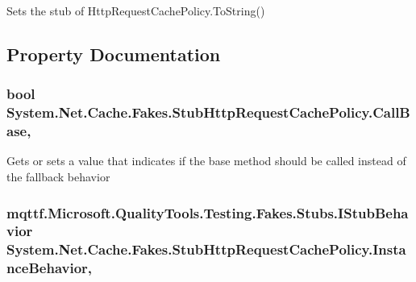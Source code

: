 Sets the stub of Http\-Request\-Cache\-Policy.\-To\-String()



\subsection{Property Documentation}
\hypertarget{class_system_1_1_net_1_1_cache_1_1_fakes_1_1_stub_http_request_cache_policy_aa3db4a29b2626996ae91bdab91d55253}{
\subsubsection[{Call\-Base}]{\setlength{\rightskip}{0pt plus 5cm}bool System.\-Net.\-Cache.\-Fakes.\-Stub\-Http\-Request\-Cache\-Policy.\-Call\-Base\hspace{0.3cm}{\ttfamily [get]}, {\ttfamily [set]}}}\label{class_system_1_1_net_1_1_cache_1_1_fakes_1_1_stub_http_request_cache_policy_aa3db4a29b2626996ae91bdab91d55253}


Gets or sets a value that indicates if the base method should be called instead of the fallback behavior

\hypertarget{class_system_1_1_net_1_1_cache_1_1_fakes_1_1_stub_http_request_cache_policy_aec680d2542fdfec1604d9ff9dc51595a}{
\subsubsection[{Instance\-Behavior}]{\setlength{\rightskip}{0pt plus 5cm}mqttf.\-Microsoft.\-Quality\-Tools.\-Testing.\-Fakes.\-Stubs.\-I\-Stub\-Behavior System.\-Net.\-Cache.\-Fakes.\-Stub\-Http\-Request\-Cache\-Policy.\-Instance\-Behavior\hspace{0.3cm}{\ttfamily [get]}, {\ttfamily [set]}}}\label{class_system_1_1_net_1_1_cache_1_1_fakes_1_1_stub_http_request_cache_policy_aec680d2542fdfec1604d9ff9dc51595a}


